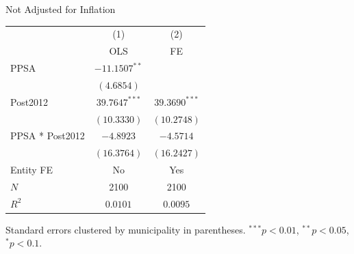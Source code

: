 \begin{table}[H]
    \centering
    \scriptsize
    \begin{minipage}{\textwidth}
    \centering
    {\normalsize Not Adjusted for Inflation}
    \vspace{6pt}
    \begin{tabular}{lcc}
        \toprule
         & (1) & (2) \\
         & OLS & FE \\
        \midrule
        PPSA & $-11.1507^{**}$ &  \\
         & $(4.6854)$ &  \\[4pt]
        Post2012 & $39.7647^{***}$ & $39.3690^{***}$ \\
         & $(10.3330)$ & $(10.2748)$ \\[4pt]
        PPSA * Post2012 & $-4.8923$ & $-4.5714$ \\
         & $(16.3764)$ & $(16.2427)$ \\[4pt]
        \midrule
        Entity FE & No & Yes \\
        $N$ & 2100 & 2100 \\
        $R^2$ & $0.0101$ & $0.0095$ \\
        \bottomrule
    \end{tabular}

    \vspace{6pt}
    {\scriptsize Standard errors clustered by municipality in parentheses. $^{***}p<0.01$, $^{**}p<0.05$, $^{*}p<0.1$.}
    \end{minipage}
\end{table}